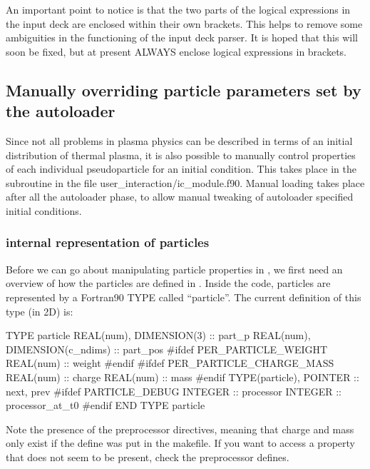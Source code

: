 An important point to notice is that the two parts of the logical expressions
in the input deck are enclosed within their own brackets. This helps to remove
some ambiguities in the functioning of the input deck parser. It is hoped that
this will soon be fixed, but at present ALWAYS enclose logical expressions in
brackets.


\subsection{Manually overriding particle parameters set by the autoloader}
\label{sec:manualload}

Since not all problems in plasma physics can be described in terms of an
initial distribution of thermal plasma, it is also possible to manually
control properties of each individual pseudoparticle for an initial
condition. This takes place in the subroutine  in the
file user\_interaction/ic\_module.f90. Manual loading takes place after
all the autoloader phase, to allow manual tweaking of autoloader specified
initial conditions.

\subsubsection{{\EPOCH} internal representation of particles}
\label{sec:partrep}
Before we can go about manipulating particle properties in
, we first need an overview of how the particles
are defined in {\EPOCH}.
Inside the code, particles are represented by a Fortran90 TYPE called
``particle''. The current definition of this type (in 2D) is:
\begin{boxverbatim}
  TYPE particle
    REAL(num), DIMENSION(3) :: part_p
    REAL(num), DIMENSION(c_ndims) :: part_pos
#ifdef PER_PARTICLE_WEIGHT
    REAL(num) :: weight
#endif
#ifdef PER_PARTICLE_CHARGE_MASS
    REAL(num) :: charge
    REAL(num) :: mass
#endif
    TYPE(particle), POINTER :: next, prev
#ifdef PARTICLE_DEBUG
    INTEGER :: processor
    INTEGER :: processor_at_t0
#endif
  END TYPE particle
\end{boxverbatim}
Note the presence of the preprocessor directives, meaning that charge and mass
only exist if the  define was put in
the makefile. If you want to access a property that does not seem to be
present, check the preprocessor defines.

